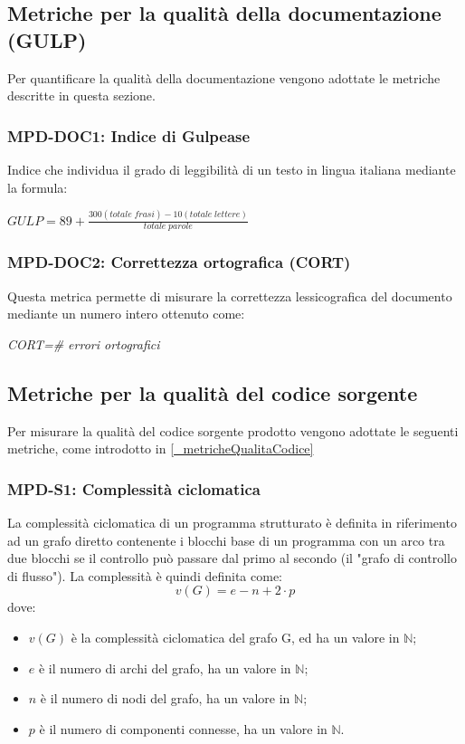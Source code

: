 \subsection{Metriche per la qualità della documentazione (GULP)} \label{_metricheprodotto}
Per quantificare la qualità della documentazione vengono adottate le metriche descritte in questa sezione.
\subsubsection{MPD-DOC1: Indice di Gulpease}
Indice che individua il grado di leggibilità di un testo in lingua italiana mediante la formula:
\begin{center}
    \(GULP=89+\frac{300(totale\; frasi)-10(totale\; lettere)}{totale\; parole}\)
\end{center}


\subsubsection{MPD-DOC2: Correttezza ortografica (CORT)}
Questa metrica permette di misurare la correttezza lessicografica del documento mediante un numero intero ottenuto come:
\begin{center}
    \textit{CORT=\# errori ortografici}
\end{center}


\subsection{Metriche per la qualità del codice sorgente} \label{_metricheCodiceSorgenteApp}
Per misurare la qualità del codice sorgente prodotto vengono adottate le seguenti metriche, come introdotto in \ref{_metricheQualitaCodice}

\subsubsection{MPD-S1: Complessità ciclomatica}
La complessità ciclomatica di un programma strutturato è definita in riferimento ad un grafo diretto
contenente i blocchi base di un programma con un arco tra due blocchi se il controllo può passare dal
primo al secondo (il "grafo di controllo di flusso"). La complessità è quindi definita come:
\[
    v(G) = e − n + 2 \cdot p  
\]
dove:
\begin{itemize}
    \item $v(G)$ è la complessità ciclomatica del grafo G, ed ha un valore in $\mathbb{N}$;
    \item $e$ è il numero di archi del grafo, ha un valore in $\mathbb{N}$;
    \item $n$ è il numero di nodi del grafo, ha un valore in $\mathbb{N}$;
    \item $p$ è il numero di componenti connesse, ha un valore in $\mathbb{N}$.
\end{itemize}

